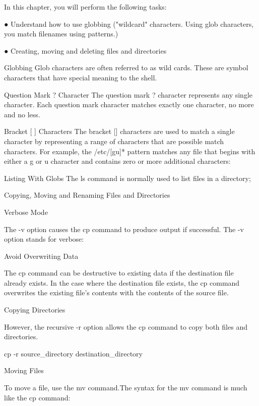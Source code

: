 In this chapter, you will perform the following tasks:

● Understand how to use globbing ("wildcard" characters. Using glob characters, you match filenames 
using patterns.)

● Creating, moving and deleting files and directories



Globbing
Glob characters are often referred to as wild cards. These are symbol characters that have special meaning to the shell.



Question Mark ? Character
The question mark ? character represents any single character. Each question mark character matches exactly one 
character, no more and no less.



Bracket [ ] Characters
The bracket [] characters are used to match a single character by representing a range of characters that are possible 
match characters. For example, the /etc/[gu]* pattern matches any file that begins with either a g or u character and 
contains zero or more additional characters:



Listing With Globs
The ls command is normally used to list files in a directory;



Copying, Moving and Renaming 
Files and Directories



Verbose Mode

The -v option causes the cp command to produce output if successful. The -v option 
stands for verbose:



Avoid Overwriting Data

The cp command can be destructive to existing data if the destination file already exists. In the case where the destination file 
exists, the cp command overwrites the existing file's contents with the contents of the source file.



Copying Directories

However, the recursive -r option allows the cp command to copy both files and directories.

cp -r source_directory destination_directory



Moving Files

To move a file, use the mv command.The syntax for the mv command is much like the cp command:

